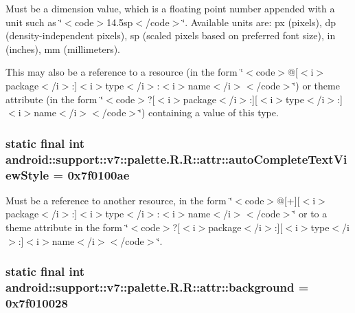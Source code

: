 Must be a dimension value, which is a floating point number appended with a unit such as \char`\"{}$<$code$>$14.5sp$<$/code$>$\char`\"{}. Available units are: px (pixels), dp (density-independent pixels), sp (scaled pixels based on preferred font size), in (inches), mm (millimeters). 

This may also be a reference to a resource (in the form \char`\"{}$<$code$>$@\mbox{[}$<$i$>$package$<$/i$>$:\mbox{]}$<$i$>$type$<$/i$>$:$<$i$>$name$<$/i$>$$<$/code$>$\char`\"{}) or theme attribute (in the form \char`\"{}$<$code$>$?\mbox{[}$<$i$>$package$<$/i$>$:\mbox{]}\mbox{[}$<$i$>$type$<$/i$>$:\mbox{]}$<$i$>$name$<$/i$>$$<$/code$>$\char`\"{}) containing a value of this type. \hypertarget{classandroid_1_1support_1_1v7_1_1palette_1_1_r_1_1attr_7003620ec401085bfcc86270376d454a}{
\subsubsection[{autoCompleteTextViewStyle}]{\setlength{\rightskip}{0pt plus 5cm}static final int android::support::v7::palette.R.R::attr::autoCompleteTextViewStyle = 0x7f0100ae}}
\label{classandroid_1_1support_1_1v7_1_1palette_1_1_r_1_1attr_7003620ec401085bfcc86270376d454a}


Must be a reference to another resource, in the form \char`\"{}$<$code$>$@\mbox{[}+\mbox{]}\mbox{[}$<$i$>$package$<$/i$>$:\mbox{]}$<$i$>$type$<$/i$>$:$<$i$>$name$<$/i$>$$<$/code$>$\char`\"{} or to a theme attribute in the form \char`\"{}$<$code$>$?\mbox{[}$<$i$>$package$<$/i$>$:\mbox{]}\mbox{[}$<$i$>$type$<$/i$>$:\mbox{]}$<$i$>$name$<$/i$>$$<$/code$>$\char`\"{}. \hypertarget{classandroid_1_1support_1_1v7_1_1palette_1_1_r_1_1attr_678eb7bd3327236302d9a0dab1117a58}{
\subsubsection[{background}]{\setlength{\rightskip}{0pt plus 5cm}static final int android::support::v7::palette.R.R::attr::background = 0x7f010028}}
\label{classandroid_1_1support_1_1v7_1_1palette_1_1_r_1_1attr_678eb7bd3327236302d9a0dab1117a58}


